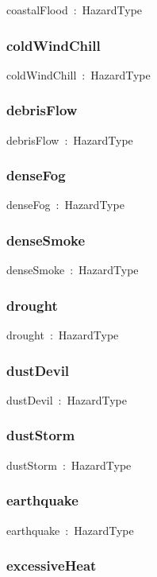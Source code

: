 \documentclass{article}
\begin{document}
coastalFlood~:~HazardType

\subsubsection*{coldWindChill}

coldWindChill~:~HazardType

\subsubsection*{debrisFlow}

debrisFlow~:~HazardType

\subsubsection*{denseFog}

denseFog~:~HazardType

\subsubsection*{denseSmoke}

denseSmoke~:~HazardType

\subsubsection*{drought}

drought~:~HazardType

\subsubsection*{dustDevil}

dustDevil~:~HazardType

\subsubsection*{dustStorm}

dustStorm~:~HazardType

\subsubsection*{earthquake}

earthquake~:~HazardType

\subsubsection*{excessiveHeat}
\end{document}
